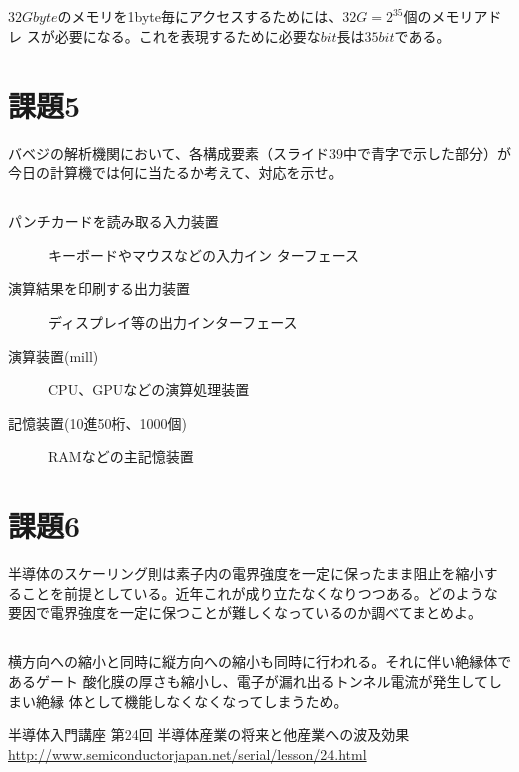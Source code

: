 \documentclass[a4j,9pt]{jsarticle}
\begin{document}
\subsection{}
$32Gbyte$のメモリを1byte毎にアクセスするためには、$32G = 2^{35}$個のメモリアドレ
スが必要になる。これを表現するために必要な$bit$長は$35bit$である。
\setcounter{section}{4}
\section{課題5}
\begin{screen}
バベジの解析機関において、各構成要素（スライド39中で青字で示した部分）が
 今日の計算機では何に当たるか考えて、対応を示せ。
\end{screen}

\subsection{}
\begin{description}
 \item[パンチカードを読み取る入力装置] キーボードやマウスなどの入力イン
            ターフェース
 \item[演算結果を印刷する出力装置] ディスプレイ等の出力インターフェース
 \item[演算装置(mill)] CPU、GPUなどの演算処理装置
 \item[記憶装置(10進50桁、1000個)] RAMなどの主記憶装置
\end{description}

\section{課題6}
\begin{screen}
 半導体のスケーリング則は素子内の電界強度を一定に保ったまま阻止を縮小す
 ることを前提としている。近年これが成り立たなくなりつつある。どのような
 要因で電界強度を一定に保つことが難しくなっているのか調べてまとめよ。
\end{screen}
\subsection{}
横方向への縮小と同時に縦方向への縮小も同時に行われる。それに伴い絶縁体であるゲート
酸化膜の厚さも縮小し、電子が漏れ出るトンネル電流が発生してしまい絶縁
体として機能しなくなくなってしまうため。
\begin{thebibliography}{99}
 \item 半導体入門講座 第24回 半導体産業の将来と他産業への波及効果\\ \url{http://www.semiconductorjapan.net/serial/lesson/24.html}
\end{thebibliography}
\end{document}
